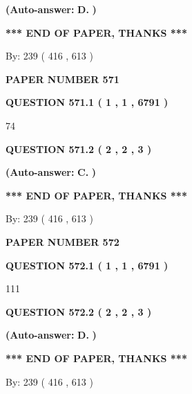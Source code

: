 \documentclass[12pt]{article}
\begin{document}
 
{\textbf{(Auto-answer:}}
{\textbf{\large{
D.}}}
{\textbf{)}}
 
 
   
   
   
   
\vspace{1.0in} 
{\textbf{\large{ *** END OF PAPER, THANKS *** }}} 
   
   
\hspace{1.0in} By: 
 239 ( 416 ,  613 )
   
   
   
   
\newpage 
\setcounter{page}{ 
   571001 } 
   
   
 {\textbf{ \Large{ PAPER NUMBER  571  }}}
   
   
   
   
  
  
{\textbf{\large{QUESTION
571.1 
 ( 1 , 1 , 6791 )
}}}

74
  
  
{\textbf{\large{QUESTION
571.2 
 ( 2 , 2 , 3 )
}}}
 
 
{\textbf{(Auto-answer:}}
{\textbf{\large{
C.}}}
{\textbf{)}}
 
 
   
   
   
   
\vspace{1.0in} 
{\textbf{\large{ *** END OF PAPER, THANKS *** }}} 
   
   
\hspace{1.0in} By: 
 239 ( 416 ,  613 )
   
   
   
   
\newpage 
\setcounter{page}{ 
   572001 } 
   
   
 {\textbf{ \Large{ PAPER NUMBER  572  }}}
   
   
   
   
  
  
{\textbf{\large{QUESTION
572.1 
 ( 1 , 1 , 6791 )
}}}

111
  
  
{\textbf{\large{QUESTION
572.2 
 ( 2 , 2 , 3 )
}}}
 
 
{\textbf{(Auto-answer:}}
{\textbf{\large{
D.}}}
{\textbf{)}}
 
 
   
   
   
   
\vspace{1.0in} 
{\textbf{\large{ *** END OF PAPER, THANKS *** }}} 
   
   
\hspace{1.0in} By: 
 239 ( 416 ,  613 )
   
   
   
\end{document}

